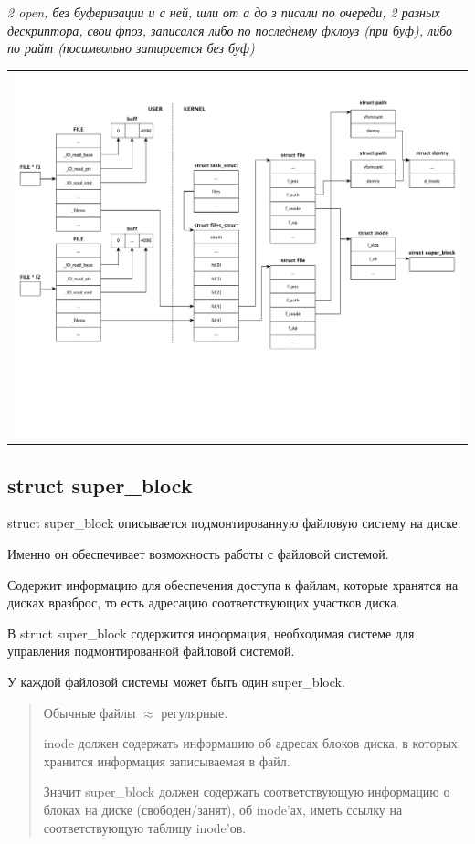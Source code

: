 \textit{2 open, без буферизации и с ней, шли от а до з писали по очереди, 2 разных дескриптора, свои фпоз, записался либо по последнему фклоуз (при буф), либо по райт (посимвольно затирается без буф)}
\begin{table}[h!]
  \centering
  \begin{tabular}{p{1\linewidth}}
    \centering
    \includegraphics[width=0.8\linewidth]{./images/scheme3.pdf}
  \end{tabular}
\end{table}


\subsection{struct super\_block}

struct super\_block описывается подмонтированную файловую систему на диске.

Именно он обеспечивает возможность работы с файловой системой.

Содержит информацию для обеспечения доступа к файлам, которые хранятся на дисках вразброс, то есть адресацию соответствующих участков диска.

В struct super\_block содержится информация, необходимая системе для управления подмонтированной файловой системой.

У каждой файловой системы может быть один super\_block.

\begin{quote}
Обычные файлы $\approx$ регулярные.

inode должен содержать информацию об адресах блоков диска, в которых хранится информация записываемая в файл.

Значит super\_block должен содержать соответствующую информацию о блоках на диске (свободен/занят), об inode'ах, иметь ссылку на соответствующую таблицу inode'ов.
\end{quote}

